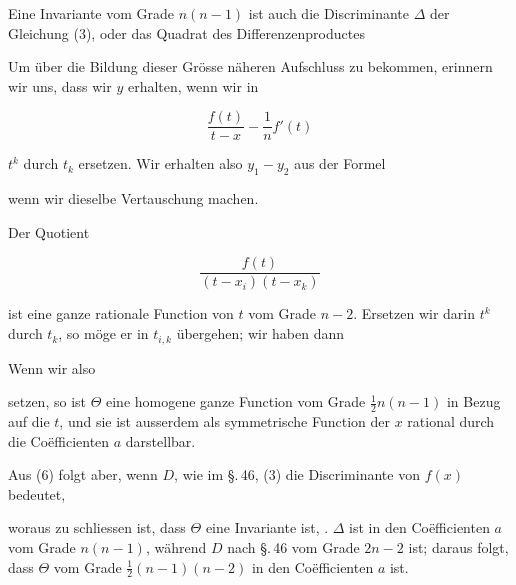 
Eine Invariante vom Grade $n(n-1)$ ist auch die Discriminante $\Delta$ der Gleichung (3), oder das Quadrat des Differenzenproductes


Um über die Bildung dieser Grösse näheren Aufschluss zu bekommen, erinnern wir uns, dass wir $y$ erhalten, wenn wir in

\[ \frac{f(t)}{t-x} - \frac{1}{n}f'(t) \]

$t^k$ durch $t_k$ ersetzen. Wir erhalten also $y_1-y_2$ aus der Formel


wenn wir dieselbe Vertauschung machen.

Der Quotient

\[ \frac{f(t)}{(t-x_i)(t-x_k)} \]

ist eine ganze rationale Function von $t$ vom Grade $n-2$. Ersetzen wir darin $t^k$ durch $t_k$, so möge er in $t_{i,k}$ übergehen; wir haben dann


Wenn wir also


setzen, so ist $\Theta$ eine homogene ganze Function vom Grade $\frac{1}{2}n(n-1)$ in Bezug auf die $t$, und sie ist ausserdem als symmetrische Function der $x$ rational durch die Coëfficienten $a$ darstellbar.

Aus (6) folgt aber, wenn $D$, wie im \S.\,46, (3) die Discriminante von $f(x)$ bedeutet,


woraus zu schliessen ist, dass $\Theta$ eine Invariante ist, . $\Delta$ ist in den Coëfficienten $a$ vom Grade $n(n-1)$, während $D$ nach \S.\,46 vom Grade $2n-2$ ist; daraus folgt, dass $\Theta$ vom Grade $\frac{1}{2}(n-1)(n-2)$ in den Coëfficienten $a$ ist.
